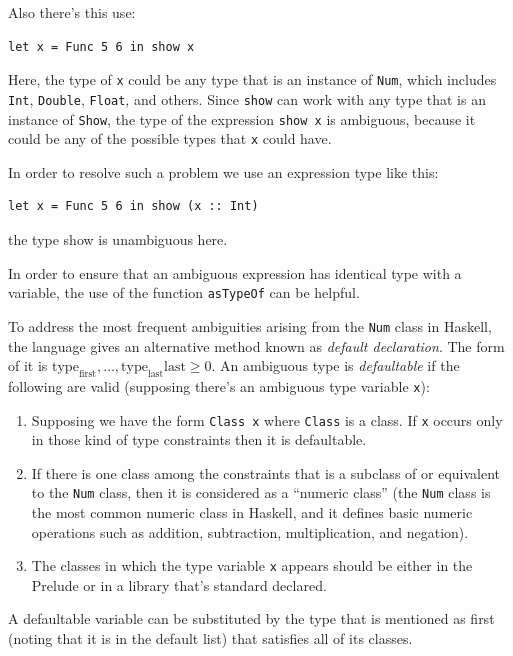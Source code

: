 \documentclass[a4paper, titlepage, twoside]{article}
\begin{document}
Also there’s this use:

\begin{verbatim}
let x = Func 5 6 in show x
\end{verbatim}

Here, the type of \texttt{x} could be any type that is an instance of \texttt{Num}, which includes \texttt{Int}, \texttt{Double}, \texttt{Float}, and others. Since \texttt{show} can work with any type that is an instance of \texttt{Show}, the type of the expression \texttt{show x} is ambiguous, because it could be any of the possible types that \texttt{x} could have.

In order to resolve such a problem we use an expression type like this:

\begin{verbatim}
let x = Func 5 6 in show (x :: Int)
\end{verbatim}
the type show is unambiguous here.

In order to ensure that an ambiguous expression has identical type with a variable, the use of the
function \texttt{asTypeOf} can be helpful.

To address the most frequent ambiguities arising from the \texttt{Num} class in Haskell, the language gives an alternative method known as \emph{default declaration}. The form of it is \(\text{type}_{\text{first}}, \dots, \text{type}_{\text{last}} \text{last} \geq 0\). An ambiguous type is \emph{defaultable} if the following are valid (supposing there’s an ambiguous type variable \texttt{x}):

\begin{enumerate}
\item Supposing we have the form \texttt{Class x} where \texttt{Class} is a class. If \texttt{x} occurs only in those kind of type constraints then it is defaultable.
\item If there is one class among the constraints that is a subclass of or equivalent to the \texttt{Num} class, then it is considered as a ``numeric class'' (the \texttt{Num} class is the most common numeric class in Haskell, and it defines basic numeric operations such as addition, subtraction, multiplication, and negation).
\item The classes in which the type variable \texttt{x} appears should be either in the Prelude or in a library that's standard declared.
\end{enumerate}

A defaultable variable can be substituted by the type that is mentioned as first (noting that it is in the default list) that satisfies all of its classes.
\end{document}
